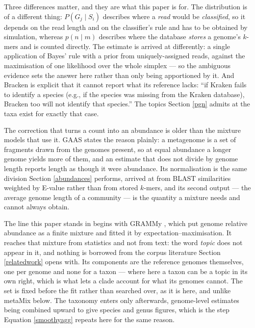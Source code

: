 \documentclass[pdflatex,sn-vancouver-num]{sn-jnl}
\begin{document}
    Three differences matter, and they are what this paper is for. The distribution is of a different
    thing: $P(G_j \mid S_i)$ describes where a \emph{read} would be \emph{classified}, so it depends
    on the read length and on the classifier's rule and has to be obtained by simulation, whereas
    $p(n \mid m)$ describes where the database \emph{stores} a genome's $k$-mers and is counted
    directly. The estimate is arrived at differently: a single application of Bayes' rule with a prior
    from uniquely-assigned reads, against the maximisation of one likelihood over the whole
    simplex --- so the ambiguous evidence sets the answer here rather than only being apportioned by
    it. And Bracken is explicit that it cannot report what its reference lacks: \enquote{if Kraken
    fails to identify a species (e.g., if the species was missing from the Kraken database), Bracken
    too will not identify that species.} The topics Section \ref{pgn} admits at the taxa
    exist for exactly that case.

    The correction that turns a count into an abundance is older than the mixture models that use it.
    GAAS \citep{gaas} states the reason plainly: a metagenome is a set of fragments drawn from the
    genomes present, so at equal abundance a longer genome yields more of them, and an estimate that
    does not divide by genome length reports length as though it were abundance. Its normalisation is
    the same division Section \ref{abundances} performs, arrived at from BLAST similarities weighted
    by E-value rather than from stored $k$-mers, and its second output --- the average genome length
    of a community --- is the quantity a mixture needs and cannot always obtain.

    The line this paper stands in begins with GRAMMy \citep{grammy}, which put genome relative
    abundance as a finite mixture and fitted it by expectation--maximisation. It reaches that mixture
    from statistics and not from text: the word \emph{topic} does not appear in it, and nothing is
    borrowed from the corpus literature Section \ref{relatedwork} opens with. Its components are the
    reference genomes themselves, one per genome and none for a taxon --- where here a taxon can be a
    topic in its own right, which is what lets a clade account for what its genomes cannot. The set
    is fixed before the fit rather than searched over, as it is here, and unlike metaMix below. The
    taxonomy enters only afterwards, genome-level estimates being combined upward to give species and
    genus figures, which is the step Equation \eqref{smoothyagg} repeats here for the same reason.
\end{document}
